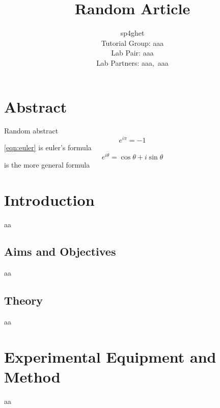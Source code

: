 \documentclass{article}
\title{Random Article}
\author{ sp4ghet \\ Tutorial Group: aaa \\ Lab Pair: aaa \\ Lab Partners: aaa,\ aaa }
\begin{document}
\maketitle
\thispagestyle{fancy}
\newpage

\section*{Abstract}
  Random abstract \autocite{Hoge2017}
  \begin{equation}\label{eqn:euler}
    e^{i\pi} = -1
  \end{equation}
  \eqref{eqn:euler} is euler's formula \\
  $$ e^{i\theta} = \cos{\theta} + i\sin{\theta}$$
  is the more general formula

\section{Introduction}
aa

\subsection{Aims and Objectives}
aa

\subsection{Theory}
aa

\section{Experimental Equipment and Method}
aa
\end{document}
